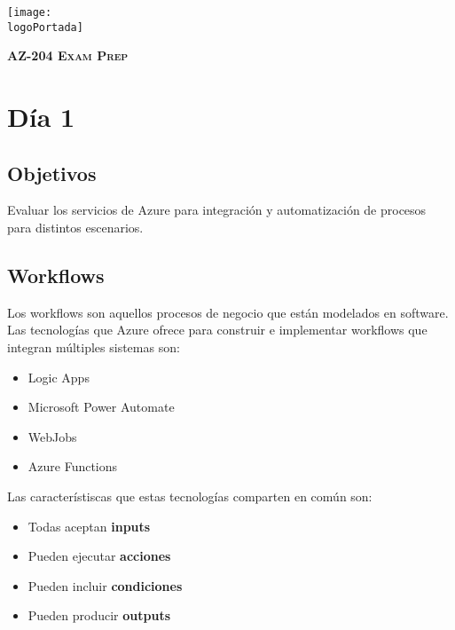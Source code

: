 \documentclass[a4paper]{article}
\newcommand{\logoPortada}{images/azure.png}
\begin{document}
    \begin{titlepage}
    \centering 
    \texttt{[image: \\logoPortada]}\par
    {\scshape\LARGE \textbf{AZ-204 Exam Prep}}
    \end{titlepage}


    \clearpage
    \tableofcontents
    \clearpage


    \section{Día 1}\par\vspace{0.2cm}
    
    \subsection {Objetivos}
    Evaluar los servicios de Azure para integración y automatización de procesos para distintos escenarios.

    \subsection {Workflows}
    Los workflows son aquellos procesos de negocio que están modelados en software. Las tecnologías que Azure ofrece para construir e implementar workflows que integran múltiples sistemas son:

    \begin{itemize}
        \item Logic Apps
        \item Microsoft Power Automate
        \item WebJobs
        \item Azure Functions
    \end{itemize}

    \vspace{0.2cm}

    Las característiscas que estas tecnologías comparten en común son:

    \begin{itemize}
        \item Todas aceptan \textbf{inputs}
        \item Pueden ejecutar \textbf{acciones}
        \item Pueden incluir \textbf{condiciones}
        \item Pueden producir \textbf{outputs}
    \end{itemize}
\end{document}
